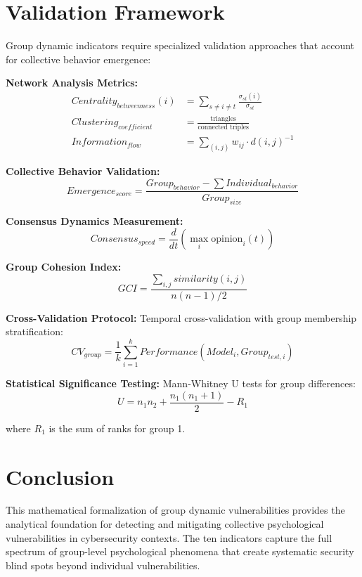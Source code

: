 \documentclass[11pt,a4paper]{article}
\begin{document}
\section{Validation Framework}

Group dynamic indicators require specialized validation approaches that account for collective behavior emergence:

\textbf{Network Analysis Metrics:}
\begin{align}
Centrality_{betweenness}(i) &= \sum_{s \neq i \neq t} \frac{\sigma_{st}(i)}{\sigma_{st}} \\
Clustering_{coefficient} &= \frac{\text{triangles}}{\text{connected triples}} \\
Information_{flow} &= \sum_{(i,j)} w_{ij} \cdot d(i,j)^{-1}
\end{align}

\textbf{Collective Behavior Validation:}
\begin{equation}
Emergence_{score} = \frac{Group_{behavior} - \sum Individual_{behavior}}{Group_{size}}
\end{equation}

\textbf{Consensus Dynamics Measurement:}
\begin{equation}
Consensus_{speed} = \frac{d}{dt}\left(\max_i \text{opinion}_i(t)\right)
\end{equation}

\textbf{Group Cohesion Index:}
\begin{equation}
GCI = \frac{\sum_{i,j} similarity(i,j)}{n(n-1)/2}
\end{equation}

\textbf{Cross-Validation Protocol:}
Temporal cross-validation with group membership stratification:
\begin{equation}
CV_{group} = \frac{1}{k} \sum_{i=1}^{k} Performance(Model_i, Group_{test,i})
\end{equation}

\textbf{Statistical Significance Testing:}
Mann-Whitney U tests for group differences:
\begin{equation}
U = n_1 n_2 + \frac{n_1(n_1+1)}{2} - R_1
\end{equation}

where $R_1$ is the sum of ranks for group 1.

\section{Conclusion}

This mathematical formalization of group dynamic vulnerabilities provides the analytical foundation for detecting and mitigating collective psychological vulnerabilities in cybersecurity contexts. The ten indicators capture the full spectrum of group-level psychological phenomena that create systematic security blind spots beyond individual vulnerabilities.
\end{document}
